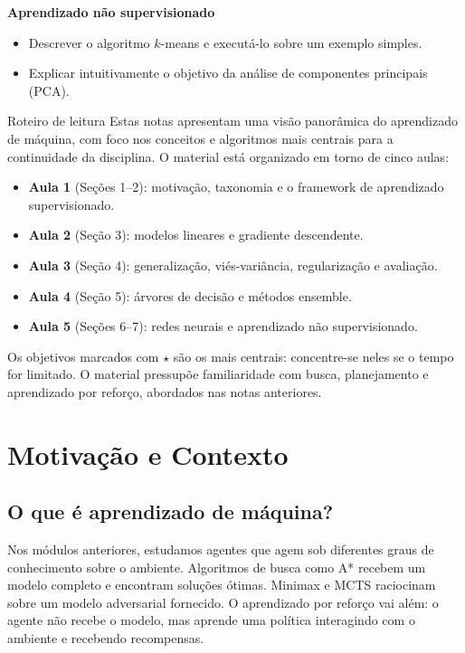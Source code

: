 \documentclass[12pt,a4paper]{article}
\begin{document}
\noindent\textbf{Aprendizado não supervisionado}
\begin{itemize}
    \item Descrever o algoritmo $k$-means e executá-lo sobre um exemplo simples.
    \item Explicar intuitivamente o objetivo da análise de componentes principais (PCA).
\end{itemize}

\begin{notabox}{Roteiro de leitura}
Estas notas apresentam uma visão panorâmica do aprendizado de máquina, com foco nos conceitos e algoritmos mais centrais para a continuidade da disciplina. O material está organizado em torno de cinco aulas:

\begin{itemize}[nosep]
\item \textbf{Aula 1} (Seções 1--2): motivação, taxonomia e o framework de aprendizado supervisionado.
\item \textbf{Aula 2} (Seção 3): modelos lineares e gradiente descendente.
\item \textbf{Aula 3} (Seção 4): generalização, viés-variância, regularização e avaliação.
\item \textbf{Aula 4} (Seção 5): árvores de decisão e métodos ensemble.
\item \textbf{Aula 5} (Seções 6--7): redes neurais e aprendizado não supervisionado.
\end{itemize}

Os objetivos marcados com $\star$ são os mais centrais: concentre-se neles se o tempo for limitado. O material pressupõe familiaridade com busca, planejamento e aprendizado por reforço, abordados nas notas anteriores.
\end{notabox}

\section{Motivação e Contexto}
\label{sec:motivacao}

\subsection{O que é aprendizado de máquina?}

Nos módulos anteriores, estudamos agentes que agem sob diferentes graus de conhecimento sobre o ambiente. Algoritmos de busca como A* recebem um modelo completo e encontram soluções ótimas. Minimax e MCTS raciocinam sobre um modelo adversarial fornecido. O aprendizado por reforço vai além: o agente não recebe o modelo, mas aprende uma política interagindo com o ambiente e recebendo recompensas.
\end{document}
